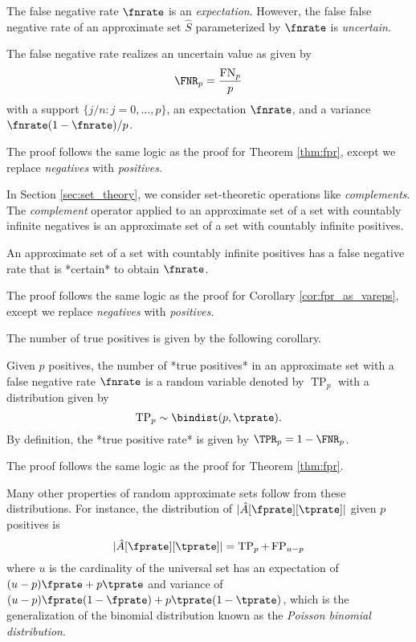 \documentclass[
]{article}
\begin{document}
The false negative rate \(\fnrate\) is an \emph{expectation}. However,
the false false negative rate of an approximate set \(\hat S\)
parameterized by \(\fnrate\) is \emph{uncertain}.

\begin{theorem}
\label{thm:fnr}
The false negative rate realizes an uncertain value as given by
$$
\FNR_p = \frac{\operatorname{FN}_p}{p}
$$
with a support $\{j / n : j = 0,\ldots,p\}$, an expectation 
$\fnrate$, 
and a variance $\fnrate(1-\fnrate) / p$.
\end{theorem}

The proof follows the same logic as the proof for Theorem \ref{thm:fpr},
except we replace \emph{negatives} with \emph{positives}.

In Section \ref{sec:set_theory}, we consider set-theoretic operations
like \emph{complements}. The \emph{complement} operator applied to an
approximate set of a set with countably infinite negatives is an
approximate set of a set with countably infinite positives.

\begin{corollary}
An approximate set of a set with countably infinite positives has a false 
negative rate that is *certain* to obtain $\fnrate$.
\end{corollary}

The proof follows the same logic as the proof for Corollary
\ref{cor:fpr_as_vareps}, except we replace \emph{negatives} with
\emph{positives}.

The number of true positives is given by the following corollary.

\begin{corollary}
\label{cor:tpbinom}
Given $p$ positives, the number of *true positives* in an approximate set 
with a false negative rate $\fnrate$ is a random variable denoted by $\operatorname{TP}_p$
with a distribution given by 
$$
    \operatorname{TP}_p \sim \bindist(p, \tprate).
$$
By definition, the *true positive rate* is given by $\TPR_p = 1 - \FNR_p$.
\end{corollary}

The proof follows the same logic as the proof for Theorem \ref{thm:fpr}.

Many other properties of random approximate sets follow from these
distributions. For instance, the distribution of
\(|\hat A[\fprate][\tprate]|\) given \(p\) positives is \begin{equation}
    |\hat A[\fprate][\tprate]| = \operatorname{TP}_p + \operatorname{FP}_{u - p}
\end{equation} where \(u\) is the cardinality of the universal set has
an expectation of \((u - p) \fprate + p \tprate\) and variance of
\((u - p) \fprate(1-\fprate) + p \tprate(1-\tprate)\), which is the
generalization of the binomial distribution known as the \emph{Poisson
binomial distribution}.
\end{document}
